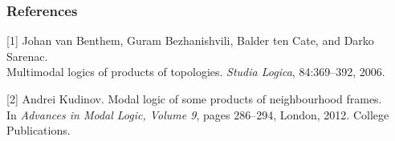\documentclass[hyperref={pdfpagelabels=false},t,10pt]{beamer}
\begin{document}
\begin{frame}
  \vspace{3.5cm}
  \centering
\end{frame}

\begin{frame}
  \frametitle{References}
    [1] Johan van Benthem, Guram Bezhanishvili, Balder ten Cate, and Darko Sarenac.\\
    Multimodal logics of products of topologies. \textit{Studia Logica}, 84:369–392, 2006. \newline

    [2] Andrei Kudinov. Modal logic of some products of neighbourhood frames.\\
    In \textit{Advances in Modal Logic, Volume 9}, pages 286–294, London, 2012. College Publications.
\end{frame}
\end{document}
